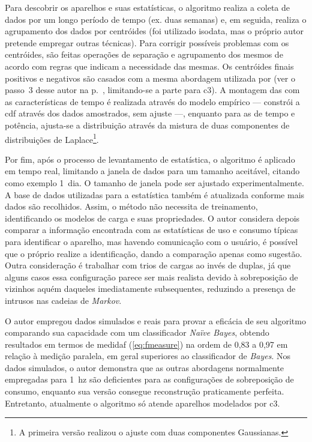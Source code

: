\begin{enumerate}[label=\textbf{1.\arabic*},wide=\parindent]
Para descobrir os aparelhos e suas estatísticas, o algoritmo realiza a
coleta de dados por um longo período de tempo (ex. duas semanas) e,
em seguida, realiza o agrupamento dos dados por centróides (foi
utilizado \acs{isodata}, mas o próprio autor pretende empregar
outras técnicas). Para corrigir possíveis problemas com os centróides,
são feitas operações de separação e agrupamento dos mesmos de acordo
com regras que indicam a necessidade das mesmas. Os centróides finais
positivos e negativos são casados com a mesma abordagem utilizada por
\citeauthor*{nilm_hart_1992_8} (ver o passo~3 desse autor na
p.~\pageref{text:passo3}, limitando-se a parte para \gls{c3}). A
montagem das  com as características de tempo é
realizada através do modelo empírico --- constrói a \acs{cdf}
através dos dados amostrados, sem ajuste ---, enquanto para as
 de tempo e potência, ajusta-se a distribuição
através da mistura de duas componentes de distribuições de
Laplace\footnote{A primeira versão realizou o ajuste com duas
componentes Gaussianas.}.

Por fim, após o processo de levantamento de estatística, o
algoritmo é aplicado em tempo real, limitando a janela de dados para um
tamanho aceitável, citando como exemplo 1~dia. O tamanho de janela
pode ser ajustado experimentalmente. A base de dados utilizadas para a
estatística também é atualizada conforme mais dados são recolhidos.
Assim, o método não necessita de treinamento, identificando os modelos
de carga e suas propriedades. O autor considera depois comparar a
informação encontrada com as estatísticas de uso e consumo típicas
para identificar o aparelho, mas havendo comunicação com o usuário, é
possível que o próprio realize a identificação, dando a comparação
apenas como sugestão. Outra consideração é trabalhar com trios de
cargas ao invés de duplas, já que alguns casos essa configuração
parece ser mais realista devido à sobreposição de vizinhos aquém
daqueles imediatamente subsequentes, reduzindo a presença de intrusos
nas cadeias de \emph{Markov}.

O autor empregou dados simulados e reais para provar a eficácia de seu
algoritmo comparando sua capacidade com um classificador \emph{Naïve
Bayes}, obtendo resultados em termos de \acs{medidaf}
(\ref{eq:fmeasure}) na ordem de 0,83 a 0,97 em relação à medição
paralela, em geral superiores ao classificador de \emph{Bayes}. Nos
dados simulados, o autor demonstra que as outras abordagens
normalmente empregadas para 1~\acs{hz} são deficientes para as
configurações de sobreposição de consumo, enquanto sua versão consegue
reconstrução praticamente perfeita. Entretanto, atualmente o algoritmo
só atende aparelhos modelados por \gls{c3}.


\end{enumerate}
